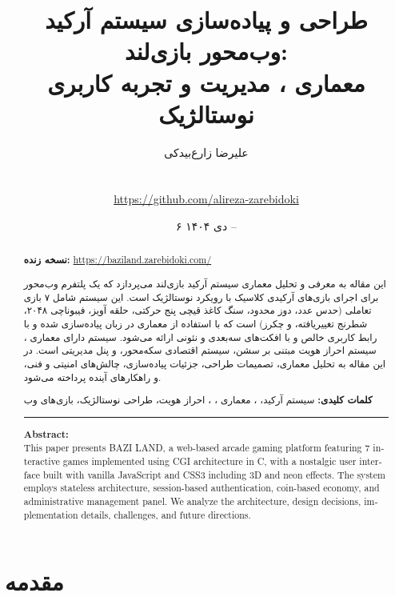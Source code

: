 \documentclass[12pt,a4paper]{article}
\title{\textbf{طراحی و پیاده‌سازی سیستم آرکید وب‌محور بازی‌لند:\\
		معماری \lr{CGI}، مدیریت \lr{Stateless} و تجربه کاربری نوستالژیک}}
\author{علیرضا زارع‌بیدکی\\
	\lr{Alireza ZareBidoki}\\
	\small \lr{alireza@zarebidoki.com}\\
	\small \url{https://github.com/alireza-zarebidoki}}
\date{\texorpdfstring{۶ دی ۱۴۰۴ -- \lr{December 26, 2025}}{6 Dey 1404 - December 26, 2025}}
\begin{document}
	
	\maketitle
	\thispagestyle{empty}
	
	\begin{abstract}
		\noindent\textbf{نسخه زنده:} \url{https://baziland.zarebidoki.com/}
		
		\vspace{0.3cm}
		
		این مقاله به معرفی و تحلیل معماری سیستم آرکید بازی‌لند  می‌پردازد که یک پلتفرم وب‌محور برای اجرای بازی‌های آرکیدی کلاسیک با رویکرد نوستالژیک است.
		این سیستم شامل ۷ بازی تعاملی (حدس عدد، دوز محدود، سنگ کاغذ قیچی پنج حرکتی، حلقه آویز، فیبوناچی ۲۰۴۸، شطرنج تغییریافته، و چکرز) است که با استفاده از معماری  در زبان  پیاده‌سازی شده و با رابط کاربری  خالص و  با افکت‌های سه‌بعدی و نئونی ارائه می‌شود.
		سیستم دارای معماری ، سیستم احراز هویت مبتنی بر سشن، سیستم اقتصادی سکه‌محور، و پنل مدیریتی است.
		در این مقاله به تحلیل معماری، تصمیمات طراحی، جزئیات پیاده‌سازی، چالش‌های امنیتی و فنی، و راهکارهای آینده پرداخته می‌شود.
		
		\textbf{کلمات کلیدی:}
		سیستم آرکید، ، معماری ، ، احراز هویت، طراحی نوستالژیک، بازی‌های وب
		
		\vspace{0.5cm}
		\hrule
		\vspace{0.5cm}
		
		\begin{latin}
			\textbf{Abstract:}\\
			This paper presents BAZI LAND, a web-based arcade gaming platform featuring 7 interactive games implemented using CGI architecture in C, with a nostalgic user interface built with vanilla JavaScript and CSS3 including 3D and neon effects.
			The system employs stateless architecture, session-based authentication, coin-based economy, and administrative management panel.
			We analyze the architecture, design decisions, implementation details, challenges, and future directions.
		\end{latin}
	\end{abstract}
	
	\newpage
	\tableofcontents
	\newpage
	
	\section{مقدمه}
	
\end{document}
